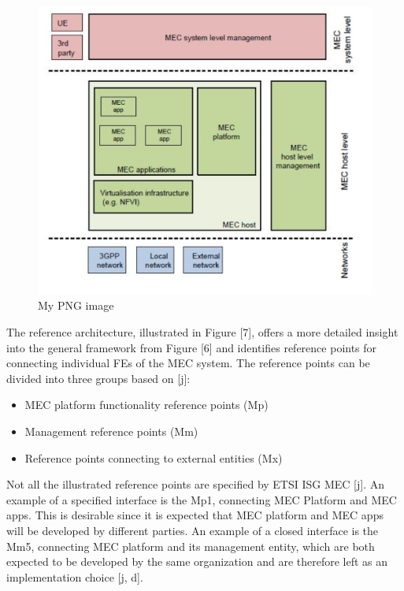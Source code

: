 \documentclass[12pt,a4paper,twoside]{report}
\begin{document}
\begin{figure}[ht]
	\centering
	\includegraphics[width=\textwidth]{./images/MEC-framework.png}
	\caption{My PNG image}
\end{figure}

The reference architecture, illustrated in Figure [7], offers a more detailed insight into the general framework from Figure [6] and identifies reference points for connecting individual FEs of the MEC system. The reference points can be divided into three groups based on [j]: 
\begin{itemize}
	\item MEC platform functionality reference points (Mp) 
	\item Management reference points (Mm)
	\item Reference points connecting to external entities (Mx)
\end{itemize}
Not all the illustrated reference points are specified by ETSI ISG MEC [j]. An example of a specified interface is the Mp1, connecting MEC Platform and MEC apps. This is desirable since it is expected that MEC platform and MEC apps will be developed by different parties. An example of a closed interface is the Mm5, connecting MEC platform and its management entity, which are both expected to be developed by the same organization and are therefore left as an implementation choice [j, d].
\end{document}
